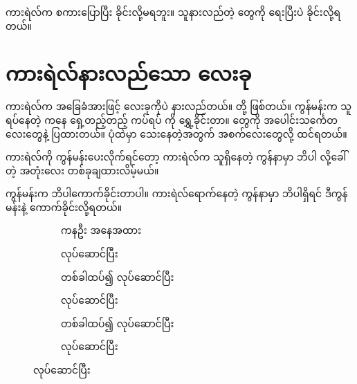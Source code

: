 \begin{sloppypar}
 ကားရဲလ်က စကားပြောပြီး ခိုင်းလို့မရဘူး။ သူနားလည်တဲ့ \encommand တွေကို \mmprogram ရေးပြီးပဲ ခိုင်းလို့ရတယ်။ 

\section{ကားရဲလ်နားလည်သော \mmcommand လေးခု}
ကားရဲလ်က အခြေခံအားဖြင့် \mmcommand လေးခုကိုပဲ နားလည်တယ်။  \mmcommand တို့ ဖြစ်တယ်။  ကွန်မန်းက သူရပ်နေတဲ့ \mmcorner ကနေ ရှေ့တည့်တည့် ကပ်ရပ် \mmcorner ကို ရွှေ့ခိုင်းတာ။ \mmcorner ‌တွေကို အပေါင်းသင်္ကေတ လေးတွေနဲ့ ပြထားတယ်။ ပုံထဲမှာ သေးနေတဲ့အတွက် အစက်လေးတွေလို့ ထင်ရတယ်။ 

ကားရဲလ်ကို  ကွန်မန်းပေးလိုက်ရင်တော့ ကားရဲလ်က သူရှိနေတဲ့ ကွန်နာမှာ ဘိပါ လို့ခေါ်တဲ့ အတုံးလေး တစ်ခုချထားလိမ့်မယ်။ 

 ကွန်မန်းက ဘိပါကောက်ခိုင်းတာပါ။ ကားရဲလ်ရောက်နေတဲ့ ကွန်နာမှာ ဘိပါရှိရင် ဒီကွန်မန်းနဲ့ ကောက်ခိုင်းလို့ရတယ်။ 

\begin{figure}[tbh!]
    \begin{subfigure}[t]{0.46\textwidth}
        \caption{ကနဦး အနေအထား}
    \end{subfigure}
    \hspace{0.1in}
    \begin{subfigure}[t]{0.46\textwidth}
        \caption{ \mmcommand လုပ်ဆောင်ပြီး}
    \end{subfigure}

    \begin{subfigure}[t]{0.46\textwidth}
        \caption{ \mmcommand တစ်ခါထပ်၍ လုပ်ဆောင်ပြီး}
    \end{subfigure}
    \hspace{0.12in}
    \begin{subfigure}[t]{0.46\textwidth}
        \caption{ \mmcommand လုပ်ဆောင်ပြီး}
    \end{subfigure}

    \begin{subfigure}[t]{0.46\textwidth}
        \caption{ \mmcommand တစ်ခါထပ်၍ လုပ်ဆောင်ပြီး}
    \end{subfigure}
    \hspace{0.1in}
    \begin{subfigure}[t]{0.46\textwidth}
        \caption{ \mmcommand လုပ်ဆောင်ပြီး}        
    \end{subfigure}


\end{figure}
\end{sloppypar}
